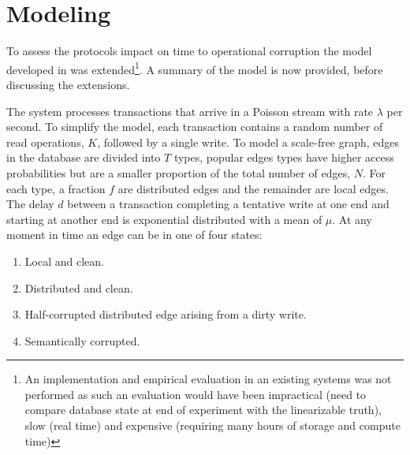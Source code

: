 \section{Modeling}
\label{sec:modeling}

To assess the protocols impact on time to operational corruption the model developed in \cite{Ezhilchelvan2018} was extended\footnote{An implementation and empirical evaluation in an existing systems was not performed as such an evaluation would have been impractical (need to compare database state at end of experiment with the linearizable truth), slow (real time) and expensive (requiring many hours of storage and compute time)}.
A summary of the model is now provided, before discussing the extensions.

The system processes transactions that arrive in a Poisson stream with rate $\lambda$ per second.
To simplify the model, each transaction contains a random number of read operations, $K$, followed by a single write.
To model a scale-free graph, edges in the database are divided into $T$ types, popular edges types have higher access probabilities but are a smaller proportion of the total number of edges, $N$.
For each type, a fraction $f$ are distributed edges and the remainder are local edges.
The delay $d$ between a transaction completing a tentative write at one end and starting at another end is exponential distributed with a mean of $\mu$.
At any moment in time an edge can be in one of four states:
\begin{enumerate}
\item Local and clean.
\item Distributed and clean.
\item Half-corrupted distributed edge arising from a dirty write.
\item Semantically corrupted.
\end{enumerate}


